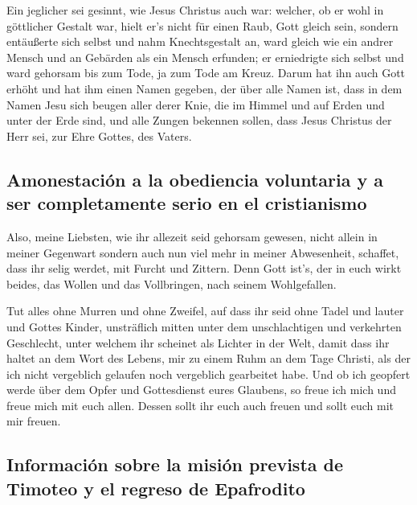  Ein jeglicher sei gesinnt, wie Jesus Christus auch war:
 welcher, ob er wohl in göttlicher Gestalt war, hielt er's
nicht für einen Raub, Gott gleich sein,  sondern
entäußerte sich selbst und nahm Knechtsgestalt an, ward gleich wie ein
andrer Mensch und an Gebärden als ein Mensch erfunden;  er
erniedrigte sich selbst und ward gehorsam bis zum Tode, ja zum Tode am
Kreuz.  Darum hat ihn auch Gott erhöht und hat ihm einen
Namen gegeben, der über alle Namen ist,  dass in dem
Namen Jesu sich beugen aller derer Knie, die im Himmel und auf Erden und
unter der Erde sind,  und alle Zungen bekennen sollen,
dass Jesus Christus der Herr sei, zur Ehre Gottes, des Vaters.

\hypertarget{amonestaciuxf3n-a-la-obediencia-voluntaria-y-a-ser-completamente-serio-en-el-cristianismo}{%
\subsection{Amonestación a la obediencia voluntaria y a ser
completamente serio en el
cristianismo}\label{amonestaciuxf3n-a-la-obediencia-voluntaria-y-a-ser-completamente-serio-en-el-cristianismo}}

 Also, meine Liebsten, wie ihr allezeit seid gehorsam
gewesen, nicht allein in meiner Gegenwart sondern auch nun viel mehr in
meiner Abwesenheit, schaffet, dass ihr selig werdet, mit Furcht und
Zittern.  Denn Gott ist's, der in euch wirkt beides, das
Wollen und das Vollbringen, nach seinem Wohlgefallen.

 Tut alles ohne Murren und ohne Zweifel, 
auf dass ihr seid ohne Tadel und lauter und Gottes Kinder, unsträflich
mitten unter dem unschlachtigen und verkehrten Geschlecht, unter welchem
ihr scheinet als Lichter in der Welt,  damit dass ihr
haltet an dem Wort des Lebens, mir zu einem Ruhm an dem Tage Christi,
als der ich nicht vergeblich gelaufen noch vergeblich gearbeitet habe.
 Und ob ich geopfert werde über dem Opfer und
Gottesdienst eures Glaubens, so freue ich mich und freue mich mit euch
allen.  Dessen sollt ihr euch auch freuen und sollt euch
mit mir freuen.

\hypertarget{informaciuxf3n-sobre-la-misiuxf3n-prevista-de-timoteo-y-el-regreso-de-epafrodito}{%
\subsection{Información sobre la misión prevista de Timoteo y el regreso
de
Epafrodito}\label{informaciuxf3n-sobre-la-misiuxf3n-prevista-de-timoteo-y-el-regreso-de-epafrodito}}

